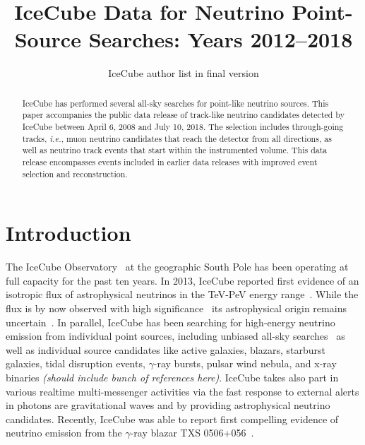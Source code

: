 \documentclass[aps,10pt,prd,twocolumn,floats,letterpaper,showpacs,nofootinbib,bibnotes,notitlepage,superscriptaddress,floatfix]{revtex4-1}
\newcommand{\MA}[1]{{\color{magenta}#1}}
\begin{document}
\title{IceCube Data for Neutrino Point-Source Searches: Years 2012--2018}

\author{\MA{IceCube author list in final version}}
%
\noaffiliation

\pacs{}

\begin{abstract}
IceCube has performed several all-sky searches for point-like neutrino sources. This paper accompanies the public data release of track-like neutrino candidates detected by IceCube between April 6, 2008 and July 10, 2018. The selection includes through-going tracks, {\it i.e.}, muon neutrino candidates that reach the detector from all directions, as well as neutrino track events that start within the instrumented volume. This data release encompasses events included in earlier data releases with improved event selection and reconstruction.
\end{abstract}

\maketitle

\section{Introduction}

The IceCube Observatory~\cite{Aartsen:2016nxy} at the geographic South Pole has been operating at full capacity for the past ten years. In 2013, IceCube reported first evidence of an isotropic flux of astrophysical neutrinos in the TeV-PeV energy range~\cite{Aartsen:2013bka,Aartsen:2013jdh}. While the flux is by now observed with high significance~\cite{Aartsen:2014gkd,Aartsen:2015rwa,Aartsen:2016xlq,IceCube:2018dnn,IceCube:2018cha} its astrophysical origin remains uncertain~\cite{Ahlers:2018fkn}. In parallel, IceCube has been searching for high-energy neutrino emission from individual point sources, including unbiased all-sky searches~\cite{Abbasi:2010rd,Aartsen:2013uuv,Aartsen:2014cva,Aartsen:2014cva,Aartsen:2018ywr,Aartsen:2019fau} as well as individual source candidates like active galaxies, blazars, starburst galaxies, tidal disruption events, $\gamma$-ray bursts,  pulsar wind nebula, and x-ray binaries \MA{\it (should include bunch of references here)}. IceCube takes also part in various realtime multi-messenger activities via the fast response to external alerts in photons are gravitational waves and by providing astrophysical neutrino candidates. Recently, IceCube was able to report first compelling evidence of neutrino emission from the $\gamma$-ray blazar TXS 0506+056~\cite{Finley:2019vpk,IceCube:2018cha}.
\end{document}
